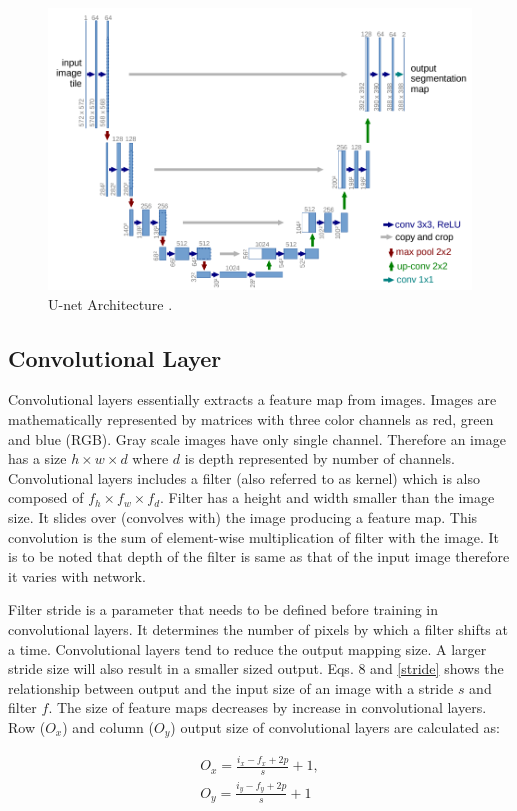 \documentclass[11pt]{article}
\begin{document}
\begin{figure}[ht!]
	\centering
	\includegraphics[width=.7\linewidth]{files/unet/arch.png}
	\caption{U-net Architecture \cite{ronneberger2015u}.}
	\label{fig:U-net}
\end{figure} 

\subsection{Convolutional Layer}
Convolutional layers essentially extracts a feature map from images. Images are mathematically represented by matrices with three color channels as red, green and blue (RGB). Gray scale images have only single channel. Therefore an image has a size $h \times w \times d$ where $d$ is depth represented by number of channels. Convolutional layers includes a filter (also referred to as kernel) which is also composed of $f_h \times f_w \times f_d$. Filter has a height and width smaller than the image size. It slides over (convolves with) the image producing a feature map. This convolution is the sum of element-wise multiplication of filter with the image. It is to be noted that depth of the filter is same as that of the input image therefore it varies with network.

Filter stride is a parameter that needs to be defined before training in convolutional layers. It determines the number of pixels by which a filter shifts at a time. Convolutional layers tend to reduce the output mapping size. A larger stride size will also result in a smaller sized output. Eqs. 8 and \ref{stride} shows the relationship between output and the input size of an image with a stride $s$ and filter $f$. The size of feature maps decreases by increase in convolutional layers. Row ($O_x$) and column ($O_y$) output size of convolutional layers are calculated as:

\begin{align}
O_{x}=\frac{i_{x}-f_{x} + 2p}{s}+1, \\
O_{y}=\frac{i_{y}-f_{y} + 2p}{s}+1
\label{stride}
\end{align} 
\end{document}
